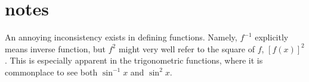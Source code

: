 \documentclass[10pt,a4paper]{report}
\begin{document}
%


\chapter*{notes}

An annoying inconsistency exists in defining functions. Namely, $f^{-1}$ explicitly means inverse function, but $f^2$ might very well refer to the square of $f$, $[f(x)]^2$. This is especially apparent in the trigonometric functions, where it is commonplace to see both $\sin^{-1} x$ and $\sin^2 x$.
\end{document}
